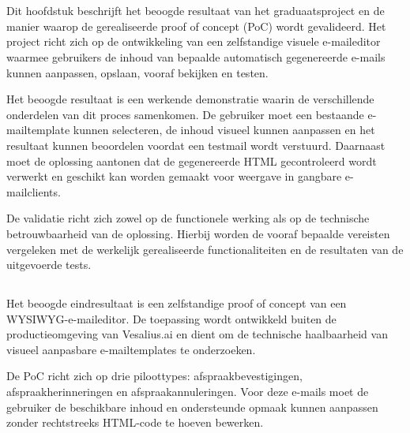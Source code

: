 

\chapter{}%
\label{ch:resultaat}
Dit hoofdstuk beschrijft het beoogde resultaat van het graduaatsproject en
de manier waarop de gerealiseerde proof of concept (PoC) wordt gevalideerd.
Het project richt zich op de ontwikkeling van een zelfstandige visuele
e-maileditor waarmee gebruikers de inhoud van bepaalde automatisch
gegenereerde e-mails kunnen aanpassen, opslaan, vooraf bekijken en testen.

Het beoogde resultaat is een werkende demonstratie waarin de verschillende
onderdelen van dit proces samenkomen. De gebruiker moet een bestaande
e-mailtemplate kunnen selecteren, de inhoud visueel kunnen aanpassen en
het resultaat kunnen beoordelen voordat een testmail wordt verstuurd.
Daarnaast moet de oplossing aantonen dat de gegenereerde HTML gecontroleerd
wordt verwerkt en geschikt kan worden gemaakt voor weergave in gangbare
e-mailclients.

De validatie richt zich zowel op de functionele werking als op de technische
betrouwbaarheid van de oplossing. Hierbij worden de vooraf bepaalde vereisten
vergeleken met de werkelijk gerealiseerde functionaliteiten en de resultaten
van de uitgevoerde tests.

\section{}%
\label{sec:opgeleverd}
Het beoogde eindresultaat is een zelfstandige proof of concept van een
WYSIWYG-e-maileditor. De toepassing wordt ontwikkeld buiten de
productieomgeving van Vesalius.ai en dient om de technische haalbaarheid
van visueel aanpasbare e-mailtemplates te onderzoeken.

De PoC richt zich op drie piloottypes: afspraakbevestigingen,
afspraakherinneringen en afspraakannuleringen. Voor deze e-mails moet de
gebruiker de beschikbare inhoud en ondersteunde opmaak kunnen aanpassen
zonder rechtstreeks HTML-code te hoeven bewerken.

